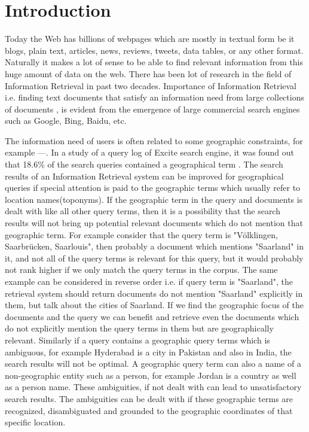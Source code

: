 \documentclass[
     11pt,         %
     a4paper,      %
     oneside,
     ]{article}
\begin{document}
\tableofcontents
\newpage





\section{Introduction}\label{sec:introduction}
Today the Web has billions of webpages which are mostly in textual form be it blogs, plain text, articles, news, reviews, tweets, data tables, or any other format. Naturally it makes a lot of sense to be able to find relevant information from this huge amount of data on the web. There has been lot of research in the field of Information Retrieval in past two decades. Importance of Information Retrieval i.e. finding text documents that satisfy an information need from large collections of documents \cite{Manning:2008:IIR:1394399}, is evident from the emergence of large commercial search engines such as Google, Bing, Baidu, etc.

The information need of users is often related to some geographic constraints, for example ---. In a study of a query log of Excite search engine, it was found out that 18.6\% of the search queries contained a geographical term \cite{Sanderson04analyzinggeographic}. The search results of an Information Retrieval system can be improved for geographical queries if special attention is paid to the geographic terms which usually refer to location names(toponyms). If the geographic term in the query and documents is dealt with like all other query terms, then it is a possibility that the search results will not bring up potential relevant documents which do not mention that geographic term. For example consider that the query term is "Völklingen, Saarbrücken, Saarlouis", then probably a document which mentions "Saarland" in it, and not all of the query terms is relevant for this query, but it would probably not rank higher if we only match the query terms in the corpus. The same example can be considered in reverse order i.e. if query term is "Saarland", the retrieval system should return documents do not mention "Saarland" explicitly in them, but talk about the cities of Saarland. If we find the geographic focus of the documents and the query we can benefit and retrieve even the documents which do not explicitly mention the query terms in them but are geographically relevant. Similarly if a query contains a geographic query terms which is ambiguous, for example Hyderabad is a city in Pakistan and also in India, the search results will not be optimal. A geographic query term can also a name of a non-geographic entity such as a person, for example Jordan is a country as well as a person name. These ambiguities, if not dealt with can lead to unsatisfactory search results. The ambiguities can be dealt with if these geographic terms are recognized, disambiguated and grounded to the geographic coordinates of that specific location. 
\end{document}
